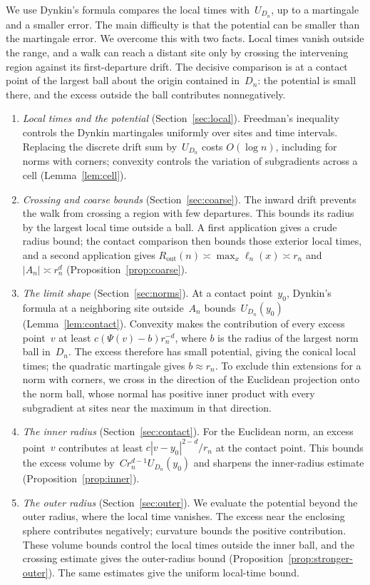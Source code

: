 \documentclass[11pt]{amsart}
\theoremstyle{plain}
\theoremstyle{definition}
\newcommand{\gauge}{\Psi}
\newcommand{\Rout}{R_{\mathrm{out}}}
\numberwithin{equation}{section}
\begin{document}
We use Dynkin's formula compares the local times with~$U_{D_n}$, up to a martingale and a smaller error. The main difficulty is that the potential can be smaller than the martingale error. We overcome this with two facts. Local times vanish outside the range, and a walk can reach a distant site only by crossing the intervening region against its first-departure drift. The decisive comparison is at a contact point of the largest ball about the origin contained in~$D_n$: the potential is small there, and the excess outside the ball contributes nonnegatively.
\begin{enumerate}[label=\arabic*.,leftmargin=*]
\item \emph{Local times and the potential} (Section~\ref{sec:local}). Freedman's inequality controls the Dynkin martingales uniformly over sites and time intervals. Replacing the discrete drift sum by~$U_{D_n}$ costs $O(\log n)$, including for norms with corners; convexity controls the variation of subgradients across a cell (Lemma~\ref{lem:cell}).
\item \emph{Crossing and coarse bounds} (Section~\ref{sec:coarse}). The inward drift prevents the walk from crossing a region with few departures. This bounds its radius by the largest local time outside a ball. A first application gives a crude radius bound; the contact comparison then bounds those exterior local times, and a second application gives $\Rout(n)\asymp\max_x\ell_n(x)\asymp r_n$ and $|A_n|\asymp r_n^d$ (Proposition~\ref{prop:coarse}).
\item \emph{The limit shape} (Section~\ref{sec:norms}). At a contact point~$y_0$, Dynkin's formula at a neighboring site outside~$A_n$ bounds~$U_{D_n}(y_0)$ (Lemma~\ref{lem:contact}). Convexity makes the contribution of every excess point~$v$ at least $c(\gauge(v)-b)r_n^{-d}$, where $b$ is the radius of the largest norm ball in~$D_n$. The excess therefore has small potential, giving the conical local times; the quadratic martingale gives $b\approx r_n$. To exclude thin extensions for a norm with corners, we cross in the direction of the Euclidean projection onto the norm ball, whose normal has positive inner product with every subgradient at sites near the maximum in that direction.
\item \emph{The inner radius} (Section~\ref{sec:contact}). For the Euclidean norm, an excess point~$v$ contributes at least $c|v-y_0|^{2-d}/r_n$ at the contact point. This bounds the excess volume by~$Cr_n^{d-1}U_{D_n}(y_0)$ and sharpens the inner-radius estimate (Proposition~\ref{prop:inner}).
\item \emph{The outer radius} (Section~\ref{sec:outer}). We evaluate the potential beyond the outer radius, where the local time vanishes. The excess near the enclosing sphere contributes negatively; curvature bounds the positive contribution. These volume bounds control the local times outside the inner ball, and the crossing estimate gives the outer-radius bound (Proposition~\ref{prop:stronger-outer}). The same estimates give the uniform local-time bound.
\end{enumerate}
\end{document}
